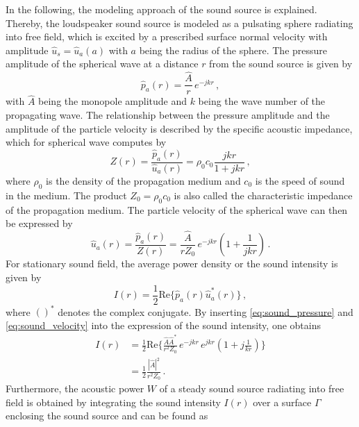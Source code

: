 In the following, the modeling approach of the sound source is explained. Thereby, the loudspeaker sound source is modeled as a pulsating sphere radiating into free field, which is excited by a prescribed surface normal velocity with amplitude $\hat{u}_s = \hat{u}_a(a)$ with $a$ being the radius of the sphere. The pressure amplitude of the spherical wave at a distance $r$ from the sound source is given by
\begin{equation}
	\hat{p}_a(r) = \frac{\hat{A}}{r}\,e^{-jkr}\,, \label{eq:sound_pressure}
\end{equation}
with $\hat{A}$ being the monopole amplitude and $k$ being the wave number of the propagating wave. The relationship between the pressure amplitude and the amplitude of the particle velocity is described by the specific acoustic impedance, which for spherical wave computes by
\begin{equation}
	Z(r) = \frac{\hat{p}_a(r)}{\hat{u}_a(r)} = \rho_0 c_0\frac{jkr}{1+jkr}\,, \label{eq:specific_impedance}
\end{equation}
where $\rho_0$ is the density of the propagation medium and $c_0$ is the speed of sound in the medium. The product $Z_0 = \rho_0 c_0$ is also called the characteristic impedance of the propagation medium. The particle velocity of the spherical wave can then be expressed by
\begin{equation}
	\hat{u}_a(r) = \frac{\hat{p}_a(r)}{Z(r)} = \frac{\hat{A}}{r Z_0}\,e^{-jkr}\left(1+\frac{1}{jkr}\right)\,. \label{eq:sound_velocity}
\end{equation}
For stationary sound field, the average power density or the sound intensity is given by
\begin{equation}
	I(r) = \frac{1}{2}\text{Re}\lbrace\hat{p}_a(r)\hat{u}_a^*(r)\rbrace\,, \label{eq:sound_intensity}
\end{equation}
where $()^*$ denotes the complex conjugate. By inserting \cref{eq:sound_pressure} and \cref{eq:sound_velocity} into the expression of the sound intensity, one obtains
\begin{align}
	I(r) &= \frac{1}{2}\text{Re}\lbrace \frac{\hat{A}\hat{A}^*}{r^2 Z_0}\,e^{-jkr}\,e^{jkr}\left(1+j\frac{1}{kr}\right)\rbrace \nonumber\\
		 &=\frac{1}{2}\frac{|\hat{A}|^2}{r^2Z_0}\,.
\end{align}
Furthermore, the acoustic power $W$ of a steady sound source radiating into free field is obtained by integrating the sound intensity $I(r)$ over a surface $\Gamma$ enclosing the sound source and can be found as
